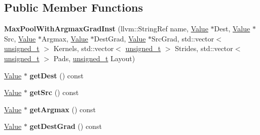 \subsection*{Public Member Functions}
\begin{DoxyCompactItemize}
\item 
\mbox{\label{classglow_1_1_max_pool_with_argmax_grad_inst_ae350c120c230e495db8fe1f4863894d1}} 
{\bfseries Max\+Pool\+With\+Argmax\+Grad\+Inst} (llvm\+::\+String\+Ref name, \hyperlink{classglow_1_1_value}{Value} $\ast$Dest, \hyperlink{classglow_1_1_value}{Value} $\ast$Src, \hyperlink{classglow_1_1_value}{Value} $\ast$Argmax, \hyperlink{classglow_1_1_value}{Value} $\ast$Dest\+Grad, \hyperlink{classglow_1_1_value}{Value} $\ast$Src\+Grad, std\+::vector$<$ \hyperlink{namespaceglow_a0ca574644e1e42ef193a9947fb4d8911}{unsigned\+\_\+t} $>$ Kernels, std\+::vector$<$ \hyperlink{namespaceglow_a0ca574644e1e42ef193a9947fb4d8911}{unsigned\+\_\+t} $>$ Strides, std\+::vector$<$ \hyperlink{namespaceglow_a0ca574644e1e42ef193a9947fb4d8911}{unsigned\+\_\+t} $>$ Pads, \hyperlink{namespaceglow_a0ca574644e1e42ef193a9947fb4d8911}{unsigned\+\_\+t} Layout)
\item 
\mbox{\label{classglow_1_1_max_pool_with_argmax_grad_inst_a4ae5c3a83613e4b8e583a41072fcd20d}} 
\hyperlink{classglow_1_1_value}{Value} $\ast$ {\bfseries get\+Dest} () const
\item 
\mbox{\label{classglow_1_1_max_pool_with_argmax_grad_inst_a04d7d76f11fb4fc7674e7398e559bab2}} 
\hyperlink{classglow_1_1_value}{Value} $\ast$ {\bfseries get\+Src} () const
\item 
\mbox{\label{classglow_1_1_max_pool_with_argmax_grad_inst_a1e373c54096e1f4245dbf72c657b8f39}} 
\hyperlink{classglow_1_1_value}{Value} $\ast$ {\bfseries get\+Argmax} () const
\item 
\mbox{\label{classglow_1_1_max_pool_with_argmax_grad_inst_a0c4fcd48f188cbd0fc96db86b7b435c7}} 
\hyperlink{classglow_1_1_value}{Value} $\ast$ {\bfseries get\+Dest\+Grad} () const
\item 
\mbox{\label{classglow_1_1_max_pool_with_argmax_grad_inst_ab49508baa2ba8ff10bcebbdc48b06aa8}} 

\end{DoxyCompactItemize}
